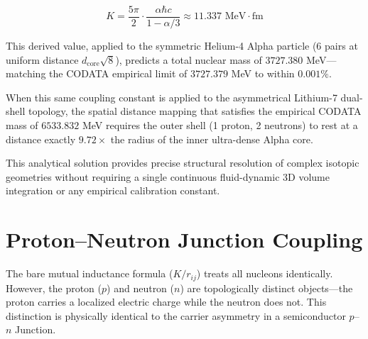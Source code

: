 \begin{equation}
    \boxed{K = \frac{5\pi}{2} \cdot \frac{\alpha \hbar c}{1 - \alpha/3} \approx 11.337 \text{ MeV}\cdot\text{fm}}
    \label{eq:k_mutual}
\end{equation}

This derived value, applied to the symmetric Helium-4 Alpha particle (6 pairs at uniform distance $d_{\text{core}}\sqrt{8}$), predicts a total nuclear mass of $3727.380$ MeV---matching the CODATA empirical limit of $3727.379$ MeV to within $0.001\%$.

When this same coupling constant is applied to the asymmetrical Lithium-7 dual-shell topology, the spatial distance mapping that satisfies the empirical CODATA mass of $6533.832$ MeV requires the outer shell (1 proton, 2 neutrons) to rest at a distance exactly $9.72\times$ the radius of the inner ultra-dense Alpha core.

This analytical solution provides precise structural resolution of complex isotopic geometries without requiring a single continuous fluid-dynamic 3D volume integration or any empirical calibration constant.

\section{Proton--Neutron Junction Coupling}
\label{sec:pn_junction}
The bare mutual inductance formula ($K/r_{ij}$) treats all nucleons identically. However, the proton ($p$) and neutron ($n$) are topologically distinct objects---the proton carries a localized electric charge while the neutron does not. This distinction is physically identical to the carrier asymmetry in a semiconductor $p$--$n$ Junction.

